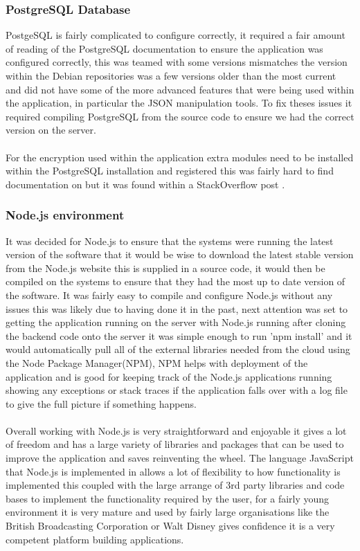 \subsubsection{PostgreSQL Database}

PostgeSQL is fairly complicated to configure correctly, it required a fair amount of reading of the PostgreSQL documentation \cite{Postgres:APIDocumentation:2015:online} to ensure the application was configured correctly, this was teamed with some versions mismatches the version within the Debian repositories was a few versions older than the most current and did not have some of the more advanced features that were being used within the application, in particular the JSON manipulation tools. To fix theses issues it required compiling PostgreSQL from the source code to ensure we had the correct version on the server.\\
\\
For the encryption used within the application extra modules need to be installed within the PostgreSQL installation and registered this was fairly hard to find documentation on but it was found within a StackOverflow post \cite{se:howtoinstallpgcrypto:2011:online}. 

\subsubsection{Node.js environment}

It was decided for Node.js to ensure that the systems were running the latest version of the software that it would be wise to download the latest stable version from the Node.js website \cite{nodeteam:node:2015:online} this is supplied in a source code, it would then be compiled on the systems to ensure that they had the most up to date version of the software. It was fairly easy to compile and configure Node.js without any issues this was likely due to having done it in the past, next attention was set to getting the application running on the server with Node.js running after cloning the backend code onto the server it was simple enough to run 'npm install' and it would automatically pull all of the external libraries needed from the cloud using the Node Package Manager(NPM), NPM helps with deployment of the application and is good for keeping track of the Node.js applications running showing any exceptions or stack traces if the application falls over with a log file to give the full picture if something happens.\\
\\
Overall working with Node.js is very straightforward and enjoyable it gives a lot of freedom and has a large variety of libraries and packages that can be used to improve the application and saves reinventing the wheel. The language JavaScript that Node.js is implemented in allows a lot of flexibility to how functionality is implemented this coupled with the large arrange of 3rd party libraries and code bases to implement the functionality required by the user, for a fairly young environment it is very mature and used by fairly large organisations like the British Broadcasting Corporation or Walt Disney gives confidence it is a very competent platform building applications.

